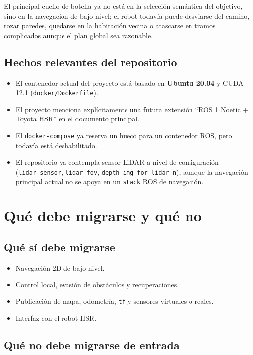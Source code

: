 \documentclass[11pt,a4paper]{article}
\begin{document}
El principal cuello de botella ya no está en la selección semántica del
objetivo, sino en la navegación de bajo nivel: el robot todavía puede desviarse
del camino, rozar paredes, quedarse en la habitación vecina o atascarse en
tramos complicados aunque el plan global sea razonable.

\subsection{Hechos relevantes del repositorio}

\begin{itemize}
  \item El contenedor actual del proyecto está basado en
        \textbf{Ubuntu 20.04} y CUDA 12.1
        (\texttt{docker/Dockerfile}).
  \item El proyecto menciona explícitamente una futura extensión
        ``ROS 1 Noetic + Toyota HSR'' en el documento principal.
  \item El \texttt{docker-compose} ya reserva un hueco para un contenedor ROS,
        pero todavía está deshabilitado.
  \item El repositorio ya contempla sensor LiDAR a nivel de configuración
        (\texttt{lidar\_sensor}, \texttt{lidar\_fov}, \texttt{depth\_img\_for\_lidar\_n}),
        aunque la navegación principal actual no se apoya en un \texttt{stack}
        ROS de navegación.
\end{itemize}

\section{Qué debe migrarse y qué no}

\subsection{Qué sí debe migrarse}

\begin{itemize}
  \item Navegación 2D de bajo nivel.
  \item Control local, evasión de obstáculos y recuperaciones.
  \item Publicación de mapa, odometría, \texttt{tf} y sensores virtuales o reales.
  \item Interfaz con el robot HSR.
\end{itemize}

\subsection{Qué no debe migrarse de entrada}
\end{document}
